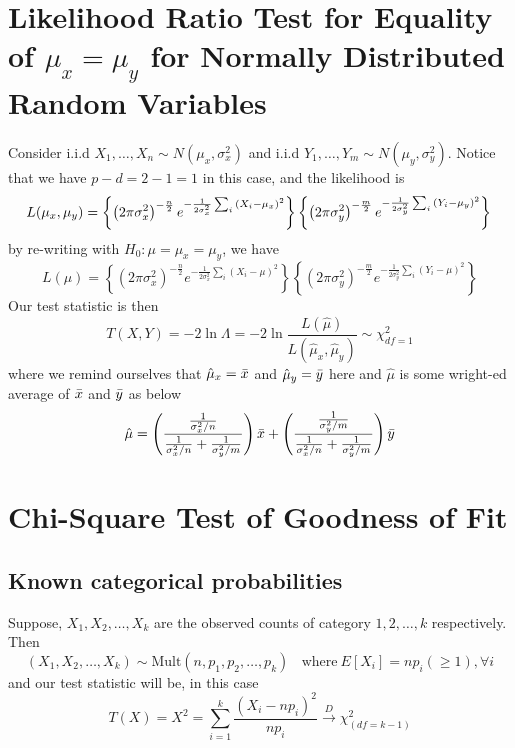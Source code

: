 \documentclass{article}
\begin{document}
\section{Likelihood Ratio Test for Equality of $\mu_x = \mu_y$ for Normally Distributed Random Variables}
Consider i.i.d $X_1,\ldots,X_n \sim N(\mu_x, \sigma_x^2)$ and i.i.d $Y_1,\ldots,Y_m \sim N(\mu_y, \sigma_y^2)$. Notice that we have $p-d = 2 - 1 = 1$ in this case, and the likelihood is
\begin{equation*}
    L(\mu_x, \mu_y) = \left\{\left(2\pi \sigma_x^2\right)^{-\frac{n}{2}}e^{-\frac{1}{2\sigma_x^2}\sum_i{\left(X_i - \mu_x\right)^2}}\right\} \left\{\left(2\pi \sigma_y^2\right)^{-\frac{m}{2}}e^{-\frac{1}{2\sigma_y^2}\sum_i{\left(Y_i - \mu_y\right)^2}}\right\} \\
\end{equation*}    
by re-writing with $H_0: \mu = \mu_x = \mu_y$, we have
\begin{equation*}
    L(\mu) = \left\{\left(2\pi \sigma_x^2\right)^{-\frac{n}{2}}e^{-\frac{1}{2\sigma_x^2}\sum_i{\left(X_i - \mu\right)^2}}\right\} \left\{\left(2\pi \sigma_y^2\right)^{-\frac{m}{2}}e^{-\frac{1}{2\sigma_y^2}\sum_i{\left(Y_i - \mu\right)^2}}\right\}
\end{equation*}
Our test statistic is then
\begin{equation*}
    T(X,Y) = -2 \ln \Lambda = -2 \ln \frac{L(\hat{\mu})}{L(\hat{\mu}_x, \hat{\mu}_y)} \sim \chi^2_{df = 1}
\end{equation*}
where we remind ourselves that $\hat{\mu}_x = \Bar{x}$ and $\hat{\mu}_y = \Bar{y}$ here and $\hat{\mu}$ is some wright-ed average of $\Bar{x}$ and $\Bar{y}$ as below
\begin{equation*}
    \hat{\mu} = \left( \frac{\frac{1}{\sigma^2_x/n}}{ \frac{1}{\sigma^2_x/n} + \frac{1}{\sigma^2_y/m} }\right)\Bar{x} + \left( \frac{\frac{1}{\sigma^2_y/m}}{ \frac{1}{\sigma^2_x/n} + \frac{1}{\sigma^2_y/m} }\right)\Bar{y}
\end{equation*}

\section{Chi-Square Test of Goodness of Fit}
\subsection{Known categorical probabilities}
Suppose, $X_1, X_2, \ldots, X_k$ are the observed counts of category $1, 2, \ldots, k$ respectively. Then
\begin{equation*}
    (X_1, X_2, \ldots, X_k) \sim \text{Mult}(n, p_1, p_2, \ldots, p_k)~~~~\text{where}~E[X_i] = np_i (\geq 1), \forall i
\end{equation*}
and our test statistic will be, in this case
\begin{equation*}
    T(X) = X^2 = \sum_{i = 1}^k \frac{\left(X_i - np_i\right)^2}{np_i} \xrightarrow{D} \chi^2_{(df=k-1)}
\end{equation*}
\end{document}
